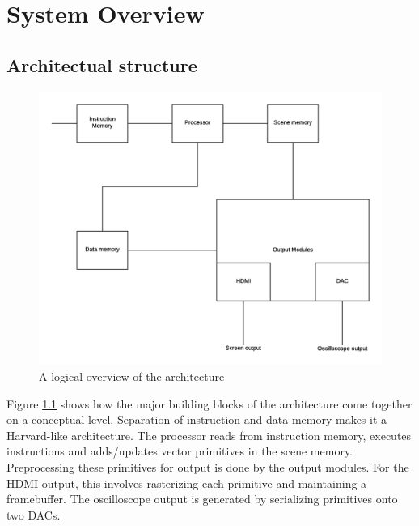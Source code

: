\chapter{System Overview}

\section{Architectual structure}

\begin{figure}[h!]
    \includegraphics[width=\linewidth]{images/system-overview.png}
    \caption{A logical overview of the \vthreek architecture}
    \label{fig:system-overview}
\end{figure}

Figure \ref{fig:system-overview} shows how the major building blocks of the \vthreek architecture come together on a conceptual level.
Separation of instruction and data memory makes it a Harvard-like architecture.
The processor reads from instruction memory, executes instructions and adds/updates vector primitives in the scene memory.
Preprocessing these primitives for output is done by the output modules.
For the HDMI output, this involves rasterizing each primitive and maintaining a framebuffer.
The oscilloscope output is generated by serializing primitives onto two DACs.
